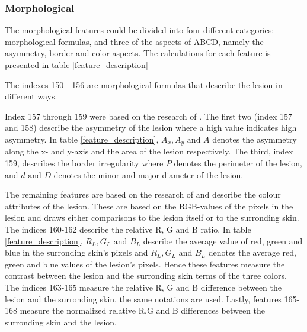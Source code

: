 \documentclass{kththesis}
\begin{document}
  
  \subsubsection{Morphological} %
  
  The morphological features could be divided into four different categories: morphological formulas, and three of the aspects of ABCD, namely the asymmetry, border and color aspects.
  The calculations for each feature is presented in table \ref{feature_description}
  
  The indexes 150 - 156 are morphological formulas that describe the lesion in different ways. %

  
  Index 157 through 159 were based on the research of \parencite{inproceedings}. The first two (index 157 and 158) describe the asymmetry of the lesion where a high value indicates high asymmetry. In table \ref{feature_description}, \(A_x, A_y \textrm{ and } A\) denotes the asymmetry along the x- and y-axis and the area of the lesion respectively. The third, index 159, describes the border irregularity where \(P\) denotes the perimeter of the lesion, and \(d \textrm{ and } D\) denotes the minor and major diameter of the lesion.

  The remaining features are based on the research of \parencite{celebi2008automatic} and describe the colour attributes of the lesion. These are based on the RGB-values of the pixels in the lesion and draws either comparisons to the lesion itself or to the surronding skin. 
  The indices 160-162 describe the relative R, G and B ratio. In table \ref{feature_description}, \(R_L, G_L \textrm{ and } B_L\) describe the average value of red, green and blue in the surronding skin's pixels and \(R_L, G_L \textrm{ and } B_L\) denotes the average red, green and blue values of the lesion's pixels. Hence these features measure the contrast between the lesion and the surronding skin terms of the three colors. The indices 163-165 measure the relative R, G and B difference between the lesion and the surronding skin, the same notations are used. Lastly, features 165-168 measure the  normalized relative R,G and B differences between the surronding skin and the lesion. \parencite{celebi2008automatic}
\end{document}
